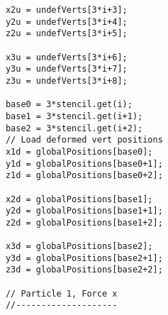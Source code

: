 \begin{lstlisting}
			x2u = undefVerts[3*i+3];
			y2u = undefVerts[3*i+4];
			z2u = undefVerts[3*i+5];
			
			x3u = undefVerts[3*i+6];
			y3u = undefVerts[3*i+7];
			z3u = undefVerts[3*i+8];
			
			base0 = 3*stencil.get(i);
			base1 = 3*stencil.get(i+1);
			base2 = 3*stencil.get(i+2);
			// Load deformed vert positions
			x1d = globalPositions[base0];
			y1d = globalPositions[base0+1];
			z1d = globalPositions[base0+2];
			
			x2d = globalPositions[base1];
			y2d = globalPositions[base1+1];
			z2d = globalPositions[base1+2];
			
			x3d = globalPositions[base2];
			y3d = globalPositions[base2+1];
			z3d = globalPositions[base2+2];
			
			// Particle 1, Force x
			//--------------------
			

\end{lstlisting}
